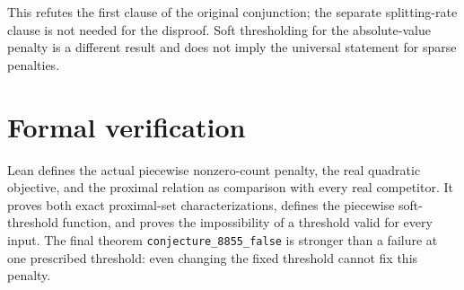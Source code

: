 \documentclass[10pt]{article}
\begin{document}
This refutes the first clause of the original conjunction; the separate
splitting-rate clause is not needed for the disproof.
Soft thresholding for the absolute-value penalty is a different result
and does not imply the universal statement for sparse penalties.

\section*{Formal verification}
Lean defines the actual piecewise nonzero-count penalty, the real
quadratic objective, and the proximal relation as comparison with every
real competitor. It proves both exact proximal-set characterizations,
defines the piecewise soft-threshold function, and proves the impossibility
of a threshold valid for every input.
The final theorem \texttt{conjecture\_8855\_false} is stronger than a
failure at one prescribed threshold: even changing the fixed threshold
cannot fix this penalty.
\end{document}
